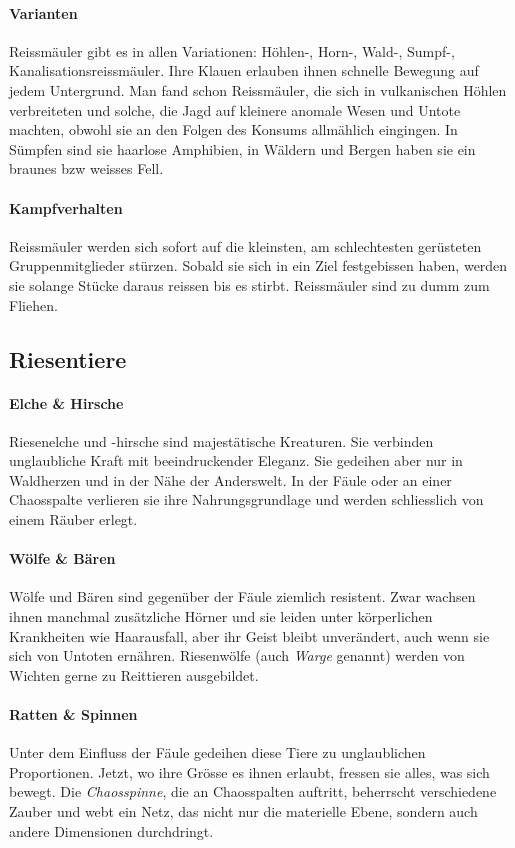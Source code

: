 \documentclass[10pt,twoside,twocolumn,openany]{book}
\begin{document}
\paragraph{Varianten} Reissmäuler gibt es in allen Variationen: Höhlen-, Horn-, Wald-, Sumpf-, Kanalisationsreissmäuler. Ihre Klauen erlauben ihnen schnelle Bewegung auf jedem Untergrund. Man fand schon Reissmäuler, die sich in vulkanischen Höhlen verbreiteten und solche, die Jagd auf kleinere anomale Wesen und Untote machten, obwohl sie an den Folgen des Konsums allmählich eingingen. In Sümpfen sind sie haarlose Amphibien, in Wäldern und Bergen haben sie ein braunes bzw weisses Fell. 

\paragraph{Kampfverhalten} Reissmäuler werden sich sofort auf die kleinsten, am schlechtesten gerüsteten Gruppenmitglieder stürzen. Sobald sie sich in ein Ziel festgebissen haben, werden sie solange Stücke daraus reissen bis es stirbt. Reissmäuler sind zu dumm zum Fliehen.

\subsection{Riesentiere}

\paragraph{Elche \& Hirsche} Riesenelche und -hirsche sind majestätische Kreaturen. Sie verbinden unglaubliche Kraft mit beeindruckender Eleganz. Sie gedeihen aber nur in Waldherzen und in der Nähe der Anderswelt. In der Fäule oder an einer Chaosspalte verlieren sie ihre Nahrungsgrundlage und werden schliesslich von einem Räuber erlegt.
\paragraph{Wölfe \& Bären} Wölfe und Bären sind gegenüber der Fäule ziemlich resistent. Zwar wachsen ihnen manchmal zusätzliche Hörner und sie leiden unter körperlichen Krankheiten wie Haarausfall, aber ihr Geist bleibt unverändert, auch wenn sie sich von Untoten ernähren. Riesenwölfe (auch \emph{Warge} genannt) werden von Wichten gerne zu Reittieren ausgebildet.
\paragraph{Ratten \& Spinnen} Unter dem Einfluss der Fäule gedeihen diese Tiere zu unglaublichen Proportionen. Jetzt, wo ihre Grösse es ihnen erlaubt, fressen sie alles, was sich bewegt. Die \emph{Chaosspinne}, die an Chaosspalten auftritt, beherrscht verschiedene Zauber und webt ein Netz, das nicht nur die materielle Ebene, sondern auch andere Dimensionen durchdringt.
\end{document}
